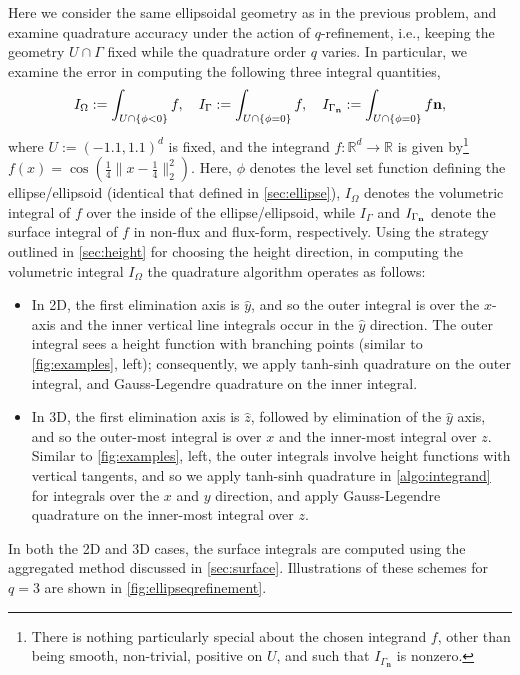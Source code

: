 \documentclass[onefignum,onetabnum,onealgnum,oneeqnum]{siamart190516}
\newcommand{\R}{\mathbb R}
\begin{document}
Here we consider the same ellipsoidal geometry as in the previous problem, and examine quadrature accuracy under the action of $q$-refinement, i.e., keeping the geometry $U \cap \Gamma$ fixed while the quadrature order $q$ varies. In particular, we examine the error in computing the following three integral quantities,
\[ I_{\Omega} := \int_{U \cap \{\phi < 0\}} f, \quad I_{\Gamma} := \int_{U \cap \{\phi = 0\}} f, \quad I_{\Gamma_{\textbf n}} := \int_{U \cap \{\phi = 0\}} f \mathbf n, \]
where $U := (-1.1,1.1)^d$ is fixed, and the integrand $f : \R^d \to \R$ is given by\footnote{There is nothing particularly special about the chosen integrand $f$, other than being smooth, non-trivial, positive on $U$, and such that $I_{\Gamma_{\mathbf n}}$ is nonzero.} $f(x) = \cos (\tfrac14 \|x - \tfrac14\|_2^2)$. Here, $\phi$ denotes the level set function defining the ellipse/ellipsoid (identical that defined in \cref{sec:ellipse}), $I_\Omega$ denotes the volumetric integral of $f$ over the inside of the ellipse/ellipsoid, while $I_{\Gamma}$ and $I_{\Gamma_{\textbf n}}$ denote the surface integral of $f$ in non-flux and flux-form, respectively. Using the strategy outlined in \cref{sec:height} for choosing the height direction, in computing the  volumetric integral $I_\Omega$ the quadrature algorithm operates as follows:
\begin{itemize}
\item In 2D, the first elimination axis is $\hat y$, and so the outer integral is over the $x$-axis and the inner vertical line integrals occur in the $\hat y$ direction. The outer integral sees a height function with branching points (similar to \cref{fig:examples}, left); consequently, we apply tanh-sinh quadrature on the outer integral, and Gauss-Legendre quadrature on the inner integral. 
\item In 3D, the first elimination axis is $\hat z$, followed by elimination of the $\hat y$ axis, and so the outer-most integral is over $x$ and the inner-most integral over $z$. Similar to \cref{fig:examples}, left, the outer integrals involve height functions with vertical tangents, and so we apply tanh-sinh quadrature in \cref{algo:integrand} for integrals over the $x$ and $y$ direction, and apply Gauss-Legendre quadrature on the inner-most integral over $z$.
\end{itemize}
In both the 2D and 3D cases, the surface integrals are computed using the aggregated method discussed in \cref{sec:surface}. Illustrations of these schemes for $q = 3$ are shown in \cref{fig:ellipseqrefinement}.
\end{document}
